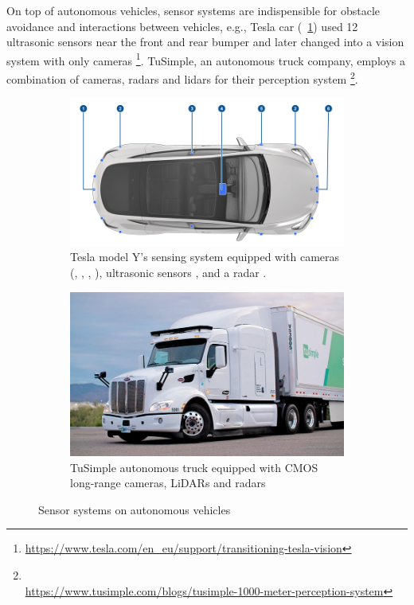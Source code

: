 On top of autonomous vehicles, sensor systems are indispensible for obstacle avoidance and interactions between vehicles, 
e.g., Tesla car (~\ref{fig:intro-tesla}) used 12 ultrasonic sensors 
near the front and rear bumper 
and later changed into a vision system with only cameras 
\footnote{\url{https://www.tesla.com/en_eu/support/transitioning-tesla-vision}}. 
TuSimple, an autonomous truck company, employs a combination of cameras, radars and lidars 
for their perception system \footnote{\\\url{https://www.tusimple.com/blogs/tusimple-1000-meter-perception-system}}. 

\begin{figure}[ht] 
    \centering 

    \begin{subfigure}[b]{0.49\textwidth} 
        \includegraphics[width=\textwidth]{figures/tesla.png} 
        \caption{
        Tesla model Y's sensing system
        equipped with cameras (, 
        , 
        , ),
        ultrasonic sensors , and a radar .
        }
        \label{fig:intro-tesla} 
    \end{subfigure} \hfill
    \begin{subfigure}[b]{0.4\textwidth} 
        \includegraphics[width=\textwidth]{figures/tusimple.jpg} 
        \caption{TuSimple autonomous truck equipped with CMOS long-range cameras, 
        LiDARs and radars} 
        \label{fig:intro-truckcam} 
    \end{subfigure} 
    \caption{Sensor systems on autonomous vehicles}
    \label{fig:intro-autonomous-vehicles}
\end{figure} 

